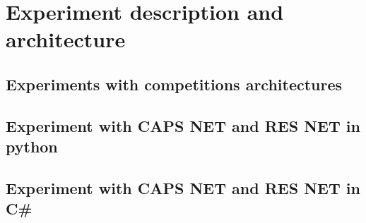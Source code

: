 \chapter{Experiment description and architecture}
    \section{Experiments with competitions architectures}
    \section{Experiment with CAPS NET and RES NET in python}
    \section{Experiment with CAPS NET and RES NET in C\#}